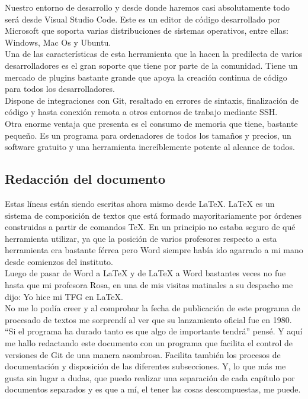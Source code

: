 Nuestro entorno de desarrollo y desde donde haremos casi absolutamente todo será desde Visual Studio Code. Este es un editor de código desarrollado por Microsoft que soporta varias distribuciones de sistemas operativos, entre ellas: Windows, Mac Os y Ubuntu.
\\Una de las características de esta herramienta que la hacen la predilecta de varios desarrolladores es el gran soporte que tiene por parte de la comunidad. Tiene un mercado de plugins bastante grande que apoya la creación continua de código para todos los desarrolladores.
\\Dispone de integraciones con Git, resaltado en errores de sintaxis, finalización de código y hasta conexión remota a otros entornos de trabajo mediante SSH.
\\Otra enorme ventaja que presenta es el consumo de memoria que tiene, bastante pequeño. Es un programa para ordenadores de todos los tamaños y precios, un software gratuito y una herramienta increíblemente potente al alcance de todos.

\subsection{Redacción del documento}

Estas líneas están siendo escritas ahora mismo desde LaTeX. LaTeX es un sistema de composición de textos que está formado mayoritariamente por órdenes construidas a partir de comandos TeX. En un principio no estaba seguro de qué herramienta utilizar, ya que la posición de varios profesores respecto a esta herramienta era bastante férrea pero Word siempre había ido agarrado a mi mano desde comienzos del instituto.
\\Luego de pasar de Word a LaTeX y de LaTeX a Word bastantes veces no fue hasta que mi profesora Rosa, en una de mis visitas matinales a su despacho me dijo: Yo hice mi TFG en LaTeX.
\\No me lo podía creer y al comprobar la fecha de publicación de este programa de procesado de textos me sorprendí al ver que su lanzamiento oficial fue en 1980. ``Si el programa ha durado tanto es que algo de importante tendrá'' pensé. Y aquí me hallo redactando este documento con un programa que facilita el control de versiones de Git de una manera asombrosa. Facilita también los procesos de documentación y disposición de las diferentes subsecciones. Y, lo que más me gusta sin lugar a dudas, que puedo realizar una separación de cada capítulo por documentos separados y es que a mí, el tener las cosas descompuestas, me puede.

